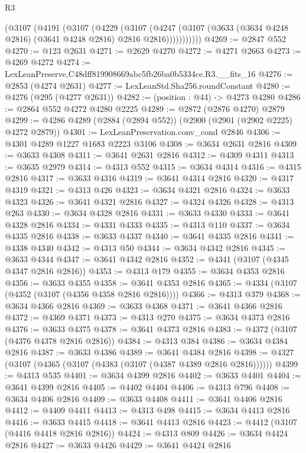 \begin{lexlean}{R3}
\begin{coremodule}
          (@3107
            (@4191
              (@3107
                (@4229
                  (@3107
                    (@4247
                      (@3107 (@3633 (@3634 @4248 @2816) (@3641 @4248 @2816) @2816 @2816)))))))))))
@4269 := @2847 @552
@4270 := @123 @2631
@4271 := @2629 @4270
@4272 := @4271 @2663
@4273 := @4269 @4272
@4274 := LexLeanPreserve.C48dff819908669abc5fb26ba0b5334ce.R3.__fits_16
@4276 := @2853 (@4274 @2631)
@4277 := LexLeanStd.Sha256.roundConstant
@4280 := @4276 (@295 (@4277 @2631))
@4282 := (position : @44) -> @4273 @4280
@4286 := @2864 @552 @4272 @4280 @2225
@4289 := @2872 (@2876 @4270) @2879
@4299 := @4286 @4289 (@2884 (@2894 @552)) (@2900 (@2901 (@2902 @2225) @4272 @2879))
@4301 := LexLeanPreservation.conv_cond @2846
@4306 := @4301 @4289 @1227 @1683 @2223 @3106
@4308 := @3634 @2631 @2816
@4309 := @3633 @4308
@4311 := @3641 @2631 @2816
@4312 := @4309 @4311
@4313 := @3635 @2979
@4314 := @4313 @552
@4315 := @3634 @4314
@4316 := @4315 @2816
@4317 := @3633 @4316
@4319 := @3641 @4314 @2816
@4320 := @4317 @4319
@4321 := @4313 @426
@4323 := @3634 @4321 @2816
@4324 := @3633 @4323
@4326 := @3641 @4321 @2816
@4327 := @4324 @4326
@4328 := @4313 @263
@4330 := @3634 @4328 @2816
@4331 := @3633 @4330
@4333 := @3641 @4328 @2816
@4334 := @4331 @4333
@4335 := @4313 @110
@4337 := @3634 @4335 @2816
@4338 := @3633 @4337
@4340 := @3641 @4335 @2816
@4341 := @4338 @4340
@4342 := @4313 @50
@4344 := @3634 @4342 @2816
@4345 := @3633 @4344
@4347 := @3641 @4342 @2816
@4352 := @4341 (@3107 (@4345 @4347 @2816 @2816))
@4353 := @4313 @179
@4355 := @3634 @4353 @2816
@4356 := @3633 @4355
@4358 := @3641 @4353 @2816
@4365 := @4334 (@3107 (@4352 (@3107 (@4356 @4358 @2816 @2816))))
@4366 := @4313 @379
@4368 := @3634 @4366 @2816
@4369 := @3633 @4368
@4371 := @3641 @4366 @2816
@4372 := @4369 @4371
@4373 := @4313 @270
@4375 := @3634 @4373 @2816
@4376 := @3633 @4375
@4378 := @3641 @4373 @2816
@4383 := @4372 (@3107 (@4376 @4378 @2816 @2816))
@4384 := @4313 @384
@4386 := @3634 @4384 @2816
@4387 := @3633 @4386
@4389 := @3641 @4384 @2816
@4398 := @4327 (@3107 (@4365 (@3107 (@4383 (@3107 (@4387 @4389 @2816 @2816))))))
@4399 := @4313 @535
@4401 := @3634 @4399 @2816
@4402 := @3633 @4401
@4404 := @3641 @4399 @2816
@4405 := @4402 @4404
@4406 := @4313 @796
@4408 := @3634 @4406 @2816
@4409 := @3633 @4408
@4411 := @3641 @4406 @2816
@4412 := @4409 @4411
@4413 := @4313 @498
@4415 := @3634 @4413 @2816
@4416 := @3633 @4415
@4418 := @3641 @4413 @2816
@4423 := @4412 (@3107 (@4416 @4418 @2816 @2816))
@4424 := @4313 @809
@4426 := @3634 @4424 @2816
@4427 := @3633 @4426
@4429 := @3641 @4424 @2816

\end{coremodule}
\end{lexlean}
